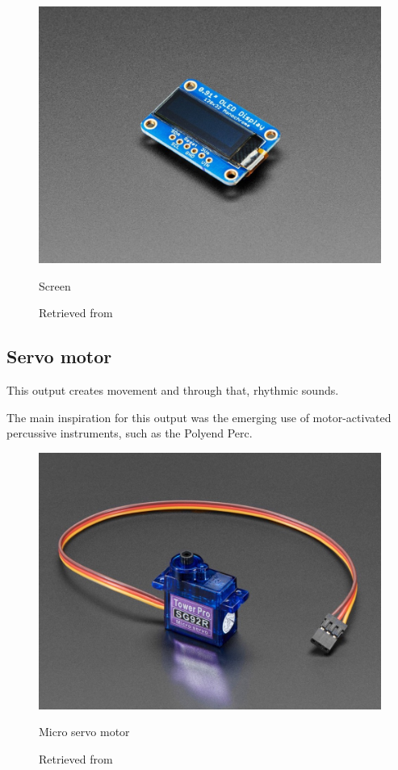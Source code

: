 \begin{figure}[ht]
  \centering
  \includegraphics[width=0.75\linewidth,height=0.25\textheight,keepaspectratio]{images/materials-adafruit-screen.jpg}
  \caption{Screen}
  \caption*{Retrieved from \cite{website-materials-adafruit-screen}}
  \label{fig:materials-adafruit-screen}
\end{figure}

\subsection{Servo motor}

This output creates movement and through that, rhythmic sounds.

The main inspiration for this output was the emerging use of motor-activated percussive instruments, such as the Polyend Perc.

\begin{figure}[ht]
  \centering
  \includegraphics[width=0.75\linewidth,height=0.25\textheight,keepaspectratio]{images/materials-adafruit-servo.jpg}
  \caption{Micro servo motor}
  \caption*{Retrieved from \cite{website-materials-adafruit-servo}}
  \label{fig:materials-adafruit-servo}
\end{figure}

